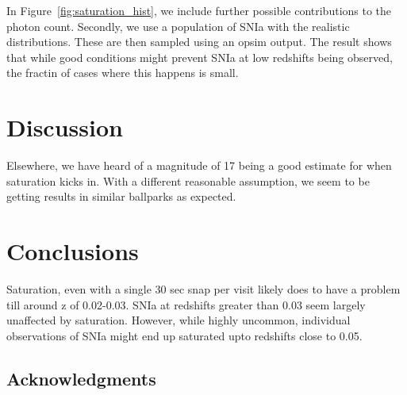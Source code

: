 \documentclass[\docopts]{\docclass}
\begin{document}
In Figure~\ref{fig:saturation_hist}, we include further possible contributions to the photon count. Secondly, we use a population of SNIa with the realistic distributions. These are then sampled using an opsim output. 
The result shows that while good conditions might prevent SNIa at low redshifts being observed, the fractin of cases where this happens is small.
\section{Discussion}
\label{sec:discussion}
Elsewhere, we have heard of a magnitude of 17 being a good estimate for when saturation kicks in. With a different reasonable assumption, we seem to be getting results in similar ballparks as expected.


\section{Conclusions}
\label{sec:conclusions}

Saturation, even with a single 30 sec snap per visit likely does to have a problem till around z of 0.02-0.03. SNIa at redshifts greater than 0.03 seem largely unaffected by saturation. However, while highly uncommon, individual observations of SNIa might end up saturated upto redshifts close to 0.05. 


\subsection*{Acknowledgments}




\end{document}
